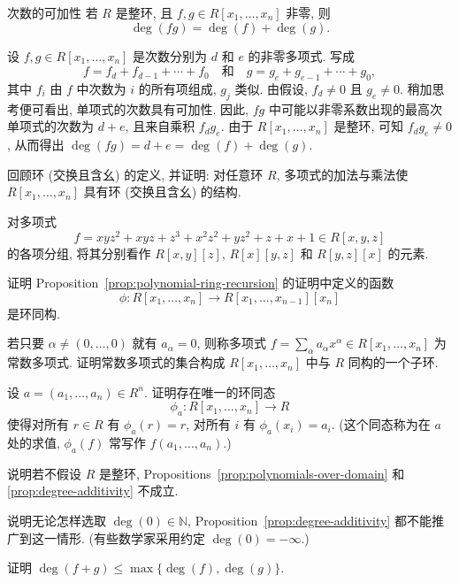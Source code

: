 \begin{Proposition}{次数的可加性}\label{prop:degree-additivity}
  若 $R$ 是整环, 且 $f,g\in R[x_{1},\ldots,x_{n}]$ 非零, 则
  \[
    \deg(fg)=\deg(f)+\deg(g).
  \]
\end{Proposition}

\begin{Proof}
  设 $f,g\in R[x_{1},\ldots,x_{n}]$ 是次数分别为 $d$ 和 $e$ 的非零多项式. 写成
  \[
    f=f_{d}+f_{d-1}+\cdots+f_{0}
    \quad\text{和}\quad
    g=g_{e}+g_{e-1}+\cdots+g_{0},
  \]
  其中 $f_{i}$ 由 $f$ 中次数为 $i$ 的所有项组成, $g_{j}$ 类似. 由假设, $f_{d}\ne0$ 且 $g_{e}\ne0$.
  稍加思考便可看出, 单项式的次数具有可加性. 因此, $fg$ 中可能以非零系数出现的最高次单项式的次数为 $d+e$, 且来自乘积 $f_{d}g_{e}$.
  由于 $R[x_{1},\ldots,x_{n}]$ 是整环, 可知 $f_{d}g_{e}\ne0$, 从而得出 $\deg(fg)=d+e=\deg(f)+\deg(g)$.
\end{Proof}

\BookExerciseHeading
\begin{BookExercises}
  \item\label{ex:polynomial-ring-laws} 回顾环 (交换且含幺) 的定义, 并证明: 对任意环 $R$, 多项式的加法与乘法使 $R[x_{1},\ldots,x_{n}]$ 具有环 (交换且含幺) 的结构.
  \item\label{ex:regroup-three-variable-polynomial} 对多项式
    \[
      f=xyz^{2}+xyz+z^{3}+x^{2}z^{2}+yz^{2}+z+x+1\in R[x,y,z]
    \]
    的各项分组, 将其分别看作 $R[x,y][z]$, $R[x][y,z]$ 和 $R[y,z][x]$ 的元素.
  \item\label{ex:recursive-ring-isomorphism} 证明 Proposition~\ref{prop:polynomial-ring-recursion} 的证明中定义的函数
    \[
      \phi:R[x_{1},\ldots,x_{n}]\to R[x_{1},\ldots,x_{n-1}][x_{n}]
    \]
    是环同构.
  \item\label{ex:constant-polynomials-subring} 若只要 $\alpha\ne(0,\ldots,0)$ 就有 $a_{\alpha}=0$, 则称多项式 $f=\sum_{\alpha}a_{\alpha}x^{\alpha}\in R[x_{1},\ldots,x_{n}]$ 为常数多项式. 证明常数多项式的集合构成 $R[x_{1},\ldots,x_{n}]$ 中与 $R$ 同构的一个子环.
  \item\label{ex:evaluation-homomorphism} 设 $a=(a_{1},\ldots,a_{n})\in R^{n}$. 证明存在唯一的环同态
    \[
      \phi_{a}:R[x_{1},\ldots,x_{n}]\to R
    \]
    使得对所有 $r\in R$ 有 $\phi_{a}(r)=r$, 对所有 $i$ 有 $\phi_{a}(x_{i})=a_{i}$. (这个同态称为在 $a$ 处的求值, $\phi_{a}(f)$ 常写作 $f(a_{1},\ldots,a_{n})$.)
  \item\label{ex:failure-without-integral-domain} 说明若不假设 $R$ 是整环, Propositions~\ref{prop:polynomials-over-domain} 和 \ref{prop:degree-additivity} 不成立.
  \item\label{ex:degree-zero-polynomial} 说明无论怎样选取 $\deg(0)\in\mathbb{N}$, Proposition~\ref{prop:degree-additivity} 都不能推广到这一情形. (有些数学家采用约定 $\deg(0)=-\infty$.)
  \item\label{ex:degree-of-sum} 证明 $\deg(f+g)\leq\max\{\deg(f),\deg(g)\}$.
\end{BookExercises}
